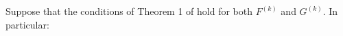\begin{theorem}
     
     
     

    Suppose that the conditions of Theorem 1 of \citet{Johnson:2013} hold for both $F^{(k)}$ and $G^{(k)}$. In particular:
    

\end{theorem}
